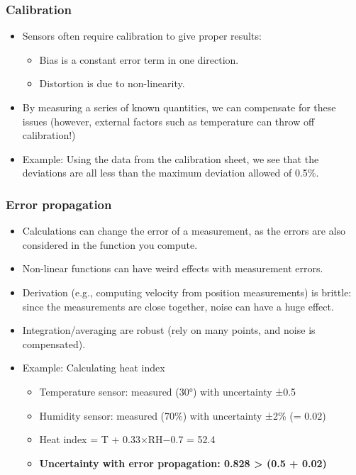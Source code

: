 \documentclass[
]{article}
\providecommand{\tightlist}{%
  \setlength{\itemsep}{0pt}\setlength{\parskip}{0pt}}
\begin{document}
\subsubsection{Calibration}\label{calibration}

\begin{itemize}
\item
  Sensors often require calibration to give proper results:

  \begin{itemize}
  \tightlist
  \item
    Bias is a constant error term in one direction.
  \item
    Distortion is due to non-linearity.
  \end{itemize}
\item
  By measuring a series of known quantities, we can compensate for these
  issues (however, external factors such as temperature can throw off
  calibration!)
\item
  Example: Using the data from the calibration sheet, we see that the
  deviations are all less than the maximum deviation allowed of 0.5\%.
\end{itemize}

\subsubsection{Error propagation}\label{error-propagation}

\begin{itemize}
\tightlist
\item
  Calculations can change the error of a measurement, as the errors are
  also considered in the function you compute.
\item
  Non-linear functions can have weird effects with measurement errors.
\item
  Derivation (e.g., computing velocity from position measurements) is
  brittle: since the measurements are close together, noise can have a
  huge effect.
\item
  Integration/averaging are robust (rely on many points, and noise is
  compensated).
\item
  Example: Calculating heat index

  \begin{itemize}
  \tightlist
  \item
    Temperature sensor: measured (30°) with uncertainty ±0.5
  \item
    Humidity sensor: measured (70\%) with uncertainty ±2\% (= 0.02)
  \item
    Heat index = T + 0.33×RH−0.7 = 52.4
  \item
    \textbf{Uncertainty with error propagation: 0.828 \textgreater{}
    (0.5 + 0.02)}
  \end{itemize}
\end{itemize}
\end{document}
